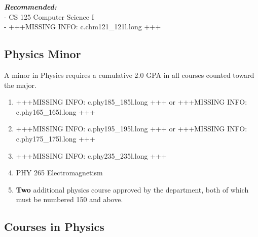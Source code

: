 \documentclass[
  letterpaper,
]{scrbook}
\begin{document}
\textbf{\emph{Recommended:}}\\
- CS 125 Computer Science I\\
- +++MISSING INFO: c.chm121\_121l.long +++

\subsection{Physics Minor}\label{physics-minor}

A minor in Physics requires a cumulative 2.0 GPA in all courses counted
toward the major.

\begin{enumerate}
\def\labelenumi{\arabic{enumi}.}
\item
  +++MISSING INFO: c.phy185\_185l.long +++ or +++MISSING INFO:
  c.phy165\_165l.long +++
\item
  +++MISSING INFO: c.phy195\_195l.long +++ or +++MISSING INFO:
  c.phy175\_175l.long +++
\item
  +++MISSING INFO: c.phy235\_235l.long +++
\item
  PHY 265 Electromagnetism
\item
  \textbf{Two} additional physics course approved by the department,
  both of which must be numbered 150 and above.
\end{enumerate}

\subsection{Courses in Physics}\label{courses-in-physics}
\end{document}
